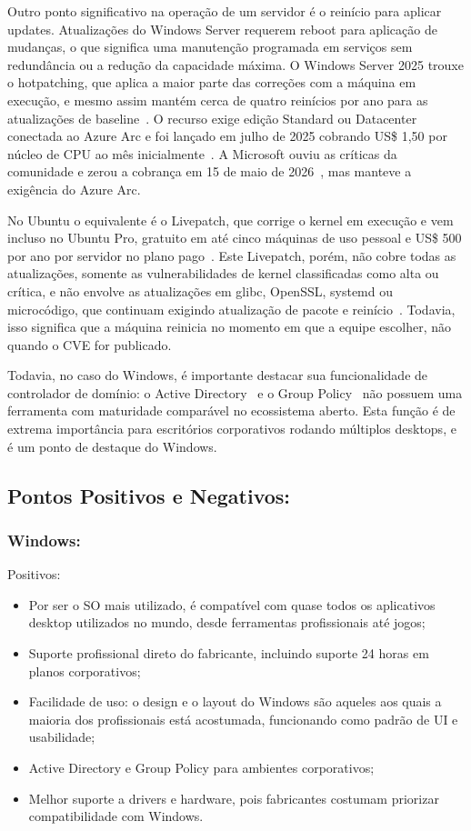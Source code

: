 Outro ponto significativo na operação de um servidor é o reinício para aplicar updates. Atualizações do Windows Server requerem reboot para aplicação de mudanças, o que significa uma manutenção programada em serviços sem redundância ou a redução da capacidade máxima. O Windows Server 2025 trouxe o hotpatching, que aplica a maior parte das correções com a máquina em execução, e mesmo assim mantém cerca de quatro reinícios por ano para as atualizações de baseline~\cite{hotpatchMicrosoft, hotpatchAnuncio}. O recurso exige edição Standard ou Datacenter conectada ao Azure Arc e foi lançado em julho de 2025 cobrando US\$ 1,50 por núcleo de CPU ao mês inicialmente~\cite{hotpatchMicrosoft, hotpatchAnuncio}. A Microsoft ouviu as críticas da comunidade e zerou a cobrança em 15 de maio de 2026~\cite{hotpatchGratuito}, mas manteve a exigência do Azure Arc.

No Ubuntu o equivalente é o Livepatch, que corrige o kernel em execução e vem incluso no Ubuntu Pro, gratuito em até cinco máquinas de uso pessoal e US\$ 500 por ano por servidor no plano pago~\cite{ubuntuProPricing}. Este Livepatch, porém, não cobre todas as atualizações, somente as vulnerabilidades de kernel classificadas como alta ou crítica, e não envolve as atualizações em glibc, OpenSSL, systemd ou microcódigo, que continuam exigindo atualização de pacote e reinício~\cite{livepatchEscopo}. Todavia, isso significa que a máquina reinicia no momento em que a equipe escolher, não quando o CVE for publicado.

Todavia, no caso do Windows, é importante destacar sua funcionalidade de controlador de domínio: o Active Directory~\cite{activeDirectory} e o Group Policy~\cite{groupPolicy} não possuem uma ferramenta com maturidade comparável no ecossistema aberto. Esta função é de extrema importância para escritórios corporativos rodando múltiplos desktops, e é um ponto de destaque do Windows.


\subsection{Pontos Positivos e Negativos:}
\subsubsection{Windows:}
Positivos:
\begin{itemize}
	\item Por ser o SO mais utilizado, é compatível com quase todos os aplicativos desktop utilizados no mundo, desde ferramentas profissionais até jogos;
	\item Suporte profissional direto do fabricante, incluindo suporte 24 horas em planos corporativos;
	\item Facilidade de uso: o design e o layout do Windows são aqueles aos quais a maioria dos profissionais está acostumada, funcionando como padrão de UI e usabilidade;
	\item Active Directory e Group Policy para ambientes corporativos;
	\item Melhor suporte a drivers e hardware, pois fabricantes costumam priorizar compatibilidade com Windows.
\end{itemize}


